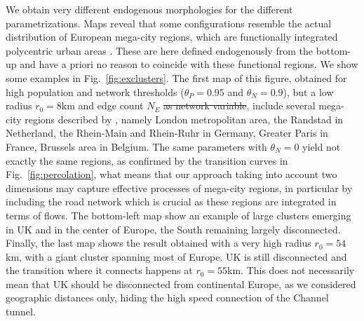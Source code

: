 \documentclass{jimis-en}
\providecommand{\DIFadd}[1]{{\protect\color{blue}\uwave{#1}}} %
\providecommand{\DIFdel}[1]{{\protect\color{red}\sout{#1}}}                      %
\providecommand{\DIFaddbegin}{} %
\providecommand{\DIFaddend}{} %
\providecommand{\DIFdelbegin}{} %
\providecommand{\DIFdelend}{} %
\newcommand{\DIFscaledelfig}{0.5}
\newlength{\DIFdelgraphicswidth} %
\newlength{\DIFdelgraphicsheight} %
\newcommand{\DIFaddincludegraphics}[2][]{{\color{blue}\fbox{\DIFOincludegraphics[#1]{#2}}}} %
\newcommand{\DIFdelincludegraphics}[2][]{%
\sbox{\DIFdelgraphicsbox}{\DIFOincludegraphics[#1]{#2}}%
\settoboxwidth{\DIFdelgraphicswidth}{\DIFdelgraphicsbox} %
\settoboxtotalheight{\DIFdelgraphicsheight}{\DIFdelgraphicsbox} %
\scalebox{\DIFscaledelfig}{%
\parbox[b]{\DIFdelgraphicswidth}{\usebox{\DIFdelgraphicsbox}\\[-\baselineskip] \rule{\DIFdelgraphicswidth}{0em}}\llap{\resizebox{\DIFdelgraphicswidth}{\DIFdelgraphicsheight}{%
\setlength{\unitlength}{\DIFdelgraphicswidth}%
\begin{picture}(1,1)%
\thicklines\linethickness{2pt} %
{\color[rgb]{1,0,0}\put(0,0){\framebox(1,1){}}}%
{\color[rgb]{1,0,0}\put(0,0){\line( 1,1){1}}}%
{\color[rgb]{1,0,0}\put(0,1){\line(1,-1){1}}}%
\end{picture}%
}\hspace*{3pt}}} %
} %
\DeclareRobustCommand{\DIFaddbegin}{\DIFOaddbegin \let\includegraphics\DIFaddincludegraphics} %
\DeclareRobustCommand{\DIFaddend}{\DIFOaddend \let\includegraphics\DIFOincludegraphics} %
\DeclareRobustCommand{\DIFdelbegin}{\DIFOdelbegin \let\includegraphics\DIFdelincludegraphics} %
\DeclareRobustCommand{\DIFdelend}{\DIFOaddend \let\includegraphics\DIFOincludegraphics} %
\begin{document}
We obtain very different endogenous morphologies for the different parametrizations. Maps reveal that some configurations resemble the actual distribution of European mega-city regions, which are functionally integrated polycentric urban areas \citep{hall2006polycentric}. These are here defined endogenously from the bottom-up and have a priori no reason to coincide with these functional regions. We show some examples in Fig.~\ref{fig:exclusters}. The first map of this figure, obtained for high population and network thresholds ($\theta_P = 0.95$ and $\theta_N = 0.9$), but a low radius $r_0 = 8$km and edge count $N_E$ \DIFdelbegin \DIFdel{as network variable}\DIFdelend \DIFaddbegin \DIFadd{to define the road network layer}\DIFaddend , include several mega-city regions described by \citep{hall2006polycentric}, namely London metropolitan area, the Randstad in Netherland, the Rhein-Main and Rhein-Ruhr in Germany, Greater Paris in France, Brussels area in Belgium. The same parameters with $\theta_N = 0$ yield not exactly the same regions, as confirmed by the transition curves in Fig.~\ref{fig:percolation}, what means that our approach taking into account two dimensions may capture effective processes of mega-city regions, in particular by including the road network which is crucial as these regions are integrated in terms of flows. The bottom-left map show an example of large clusters emerging in UK and in the center of Europe, the South remaining largely disconnected. Finally, the last map shows the result obtained with a very high radius $r_0 = 54$km, with a giant cluster spanning most of Europe. UK is still disconnected and the transition where it connects happens at $r_0 = 55$km. This does not necessarily mean that UK should be disconnected from continental Europe, as we considered geographic distances only, hiding the high speed connection of the Channel tunnel.
\end{document}
